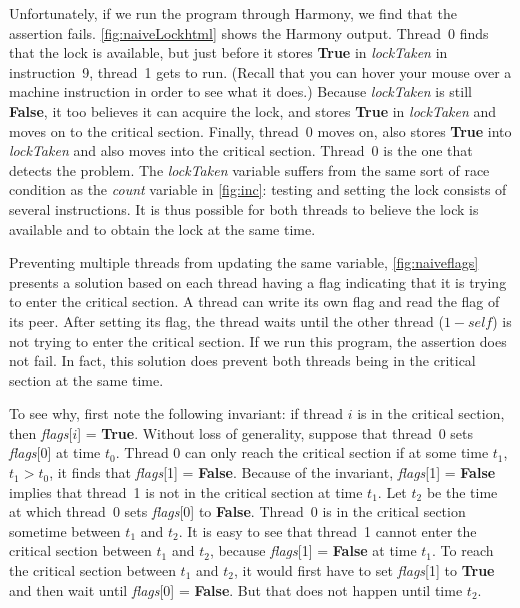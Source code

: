 \documentclass{report}
\begin{document}
Unfortunately, if we run the program through Harmony,
we find that the assertion fails.
\autoref{fig:naiveLockhtml} shows the Harmony output.
Thread~0 finds that the lock is available, but just before it stores
\textbf{True} in \textit{lockTaken} in instruction~9, thread~1 gets
to run.
(Recall that you can hover your mouse over a machine instruction in order
to see what it does.)
Because \textit{lockTaken} is still \textbf{False}, it too
believes it can acquire the lock, and stores \textbf{True} in
\textit{lockTaken} and moves on to the critical section.
Finally, thread~0 moves on, also stores \textbf{True}
into \textit{lockTaken} and also moves
into the critical section.  Thread~0 is the one that detects the
problem.
The \textit{lockTaken} variable
suffers from the same sort of race condition as the \textit{count} variable
in \autoref{fig:inc}: testing and setting the lock
consists of several instructions.  It is thus possible
for both threads to believe the lock is available and to obtain the lock
at the same time.

Preventing multiple threads from updating the same variable,
\autoref{fig:naiveflags} presents a solution based on each thread having
a flag indicating that it is trying to enter the critical section.
A thread can write its own flag and read the flag of its peer.
After setting its flag, the thread waits until the other thread
($1 - \mathit{self}$) is not trying to enter the critical section.
If we run this program, the assertion does not fail.  In fact, this
solution does prevent both threads being in the critical section at
the same time.

To see why, first note the following invariant: if thread $i$ is in the
critical section, then \textit{flags}[$i$] = \textbf{True}.
Without loss of generality,
suppose that thread~0 sets \textit{flags}[0] at time $t_0$.
Thread 0 can only reach the critical section if at some time $t_1$,
$t_1 > t_0$, it finds that \textit{flags}[1] = \textbf{False}.
Because of the invariant, \textit{flags}[1] = \textbf{False} implies that
thread~1 is not in the critical section at time $t_1$.
Let $t_2$ be the time at which thread~0 sets \textit{flags}[0]
to \textbf{False}.  Thread~0 is in the critical section sometime
between $t_1$ and $t_2$.
It is easy to see that thread~1 cannot enter the critical section
between $t_1$ and $t_2$, because \textit{flags}[1] = \textbf{False} at
time $t_1$.  To reach the critical section between $t_1$ and $t_2$,
it would first have to set \textit{flags}[1] to \textbf{True} and
then wait until \textit{flags}[0] = \textbf{False}.  But that does not happen
until time $t_2$.
\end{document}
